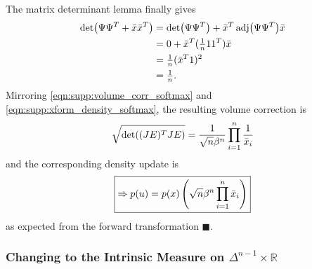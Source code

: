 The matrix determinant lemma finally gives
\begin{align}
    \begin{split}
        \Det{ \vv{\Psi} \vv{\Psi}^T + \vv{\bar{x}} \vv{\bar{x}}^T }
        & = \Det{ \vv{\Psi} \vv{\Psi}^T } + \vv{\bar{x}}^T \Adj{ \vv{\Psi} \vv{\Psi}^T } \vv{\bar{x}} \\
        & = 0 + \vv{\bar{x}}^T ( \tfrac{1}{n} \One \One^T ) \vv{\bar{x}}                              \\
        & = \tfrac{1}{n} ( \vv{\bar{x}}^T \One )^2                                                    \\
        & = \tfrac{1}{n}.
    \end{split}
\end{align}
Mirroring \eqref{eqn:supp:volume_corr_softmax} and \eqref{eqn:supp:xform_density_softmax},
the resulting volume correction is
\begin{align}\label{eqn:supp:volume_corr_inverse_softmax}
    \sqrt{\Det{ (\vv{J} \vv{E})^T \vv{J} \vv{E} }} = \frac{1}{\sqrt{n} \beta^{n}} \prod_{i=1}^{n} \frac{1}{\vv{\bar{x}}_i}
\end{align}
and the corresponding density update is
\begin{align}\label{eqn:supp:xform_density_inverse_softmax}
    \boxed{\Rightarrow p(u) = p(x) \left(\sqrt{n} \beta^{n} \prod_{i=1}^{n} \bar{x}_i\right)}
\end{align}
as expected from the forward transformation $\blacksquare$.

\subsubsection{Changing to the Intrinsic Measure on $\Delta^{n-1}\times\mathbb{R}$}\label{sec:supp:product_intrinsic_measure}

